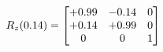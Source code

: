 \documentclass[preview]{standalone}
\begin{document}
\begin{align*}
\special{dvisvgm:raw <g id='unique000'>}R_{z}(0.14) = \begin{bmatrix}+0.99 & -0.14 & 0 \\+0.14 & +0.99 & 0 \\0 & 0 & 1\end{bmatrix}\special{dvisvgm:raw </g>}
\end{align*}
\end{document}
